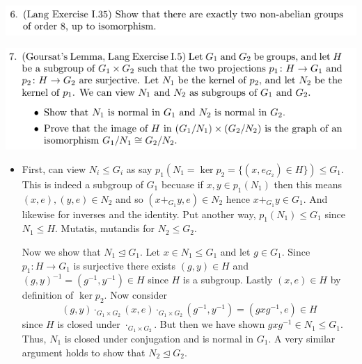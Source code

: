\documentclass[12pt,letterpaper,boxed]{hmcpset}
\newcommand{\inv}{^{-1}}
\newcommand{\normal}{\unlhd} %
\begin{document}

\begin{problem}
	\includegraphics[scale=0.8]{6.png}
	\hfill
\end{problem}

\begin{solution}
\end{solution}

\newpage


\begin{problem}
	\includegraphics[scale=0.8]{7.png}
	\hfill
\end{problem}

\begin{solution}
\begin{itemize}
\item First, can view $N_i \leq G_i$ as say $p_1(N_1 = \ker p_2 =
\{(x,e_{G_2}) \in H\}) \leq
G_1$. This is indeed a subgroup of $G_1$ becuase if $x, y \in
p_1(N_1)$ then this means $(x, e), (y, e) \in N_2$ and so $(x +_{G_1} y, e)
\in N_2$ hence $x +_{G_1} y \in G_1$. And likewise for inverses and
the identity. Put another way, $p_1(N_1) \leq G_1$ since $N_1 \leq H$. 
Mutatis, mutandis for $N_2 \leq G_2$. 

Now we show that $N_1 \unlhd G_1$.
Let $x \in N_1 \leq G_1$ and let $g \in G_1$. Since $p_1: H \to G_1$
is surjective there exists $(g, y) \in H$ and $(g, y)\inv = (g\inv, y\inv) \in H$
since $H$ is a subgroup. Lastly $(x,e) \in H$ by definition of $\ker
p_2$. 
Now consider \[
	(g, y) \cdot_{G_1 \times G_2} (x, e) \cdot_{G_1 \times G_2} (g\inv, y\inv) 
	= (g x g\inv, e) \in H
\]
since $H$ is closed under $\cdot_{G_1 \times G_2}$. But then we have
shown $g x g\inv \in N_1 \leq G_1$. Thus, $N_1$ is closed under
conjugation and is normal in $G_1$. A very similar argument holds to
show that $N_2 \normal G_2$. 

\end{itemize}
\end{solution}

\newpage
\end{document}
